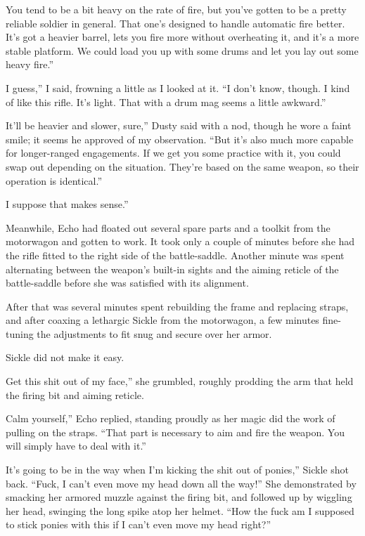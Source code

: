 \leavevmode{}You tend to be a bit heavy on the rate of fire, but you’ve gotten to be a pretty reliable soldier in general. That one’s designed to handle automatic fire better. It’s got a heavier barrel, lets you fire more without overheating it, and it’s a more stable platform. We could load you up with some drums and let you lay out some heavy fire.”

\leavevmode{}I guess,” I said, frowning a little as I looked at it. “I don’t know, though. I kind of like this rifle. It’s light. That with a drum mag seems a little awkward.”

\leavevmode{}It’ll be heavier and slower, sure,” Dusty said with a nod, though he wore a faint smile; it seems he approved of my observation. “But it’s also much more capable for longer-ranged engagements. If we get you some practice with it, you could swap out depending on the situation. They’re based on the same weapon, so their operation is identical.”

\leavevmode{}I suppose that makes sense.”

Meanwhile, Echo had floated out several spare parts and a toolkit from the motorwagon and gotten to work. It took only a couple of minutes before she had the rifle fitted to the right side of the battle-saddle. Another minute was spent alternating between the weapon’s built-in sights and the aiming reticle of the battle-saddle before she was satisfied with its alignment.

After that was several minutes spent rebuilding the frame and replacing straps, and after coaxing a lethargic Sickle from the motorwagon, a few minutes fine-tuning the adjustments to fit snug and secure over her armor.

Sickle did not make it easy.

\leavevmode{}Get this shit out of my face,” she grumbled, roughly prodding the arm that held the firing bit and aiming reticle.

\leavevmode{}Calm yourself,” Echo replied, standing proudly as her magic did the work of pulling on the straps. “That part is necessary to aim and fire the weapon. You will simply have to deal with it.”

\leavevmode{}It’s going to be in the way when I’m kicking the shit out of ponies,” Sickle shot back. “Fuck, I can’t even move my head down all the way!” She demonstrated by smacking her armored muzzle against the firing bit, and followed up by wiggling her head, swinging the long spike atop her helmet. “How the fuck am I supposed to stick ponies with this if I can’t even move my head right?”

